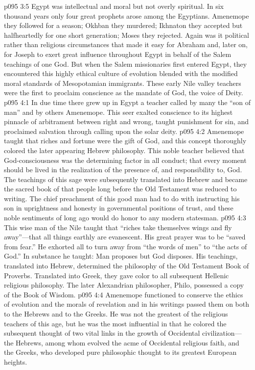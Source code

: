 \pc \vs p095 3:5 Egypt was intellectual and moral but not overly spiritual. In six thousand years only four great prophets arose among the Egyptians. Amenemope they followed for a season; Okhban they murdered; Ikhnaton they accepted but halfheartedly for one short generation; Moses they rejected. Again was it political rather than religious circumstances that made it easy for Abraham and, later on, for Joseph to exert great influence throughout Egypt in behalf of the Salem teachings of one God. But when the Salem missionaries first entered Egypt, they encountered this highly ethical culture of evolution blended with the modified moral standards of Mesopotamian immigrants. These early Nile valley teachers were the first to proclaim conscience as the mandate of God, the voice of Deity.\plusone
{}
\vs p095 4:1 In due time there grew up in Egypt a teacher called by many the “son of man” and by others Amenemope. This seer exalted conscience to its highest pinnacle of arbitrament between right and wrong, taught punishment for sin, and proclaimed salvation through calling upon the solar deity.
\vs p095 4:2 Amenemope taught that riches and fortune were the gift of God, and this concept thoroughly colored the later appearing Hebrew philosophy. This noble teacher believed that God\hyp{}consciousness was the determining factor in all conduct; that every moment should be lived in the realization of the presence of, and responsibility to, God. The teachings of this sage were subsequently translated into Hebrew and became the sacred book of that people long before the Old Testament was reduced to writing. The chief preachment of this good man had to do with instructing his son in uprightness and honesty in governmental positions of trust, and these noble sentiments of long ago would do honor to any modern statesman.
\vs p095 4:3 This wise man of the Nile taught that “riches take themselves wings and fly away”---that all things earthly are evanescent. His great prayer was to be “saved from fear.” He exhorted all to turn away from “the words of men” to “the acts of God.” In substance he taught: Man proposes but God disposes. His teachings, translated into Hebrew, determined the philosophy of the Old Testament Book of Proverbs. Translated into Greek, they gave color to all subsequent Hellenic religious philosophy. The later Alexandrian philosopher, Philo, possessed a copy of the Book of Wisdom.
\vs p095 4:4 Amenemope functioned to conserve the ethics of evolution and the morals of revelation and in his writings passed them on both to the Hebrews and to the Greeks. He was not the greatest of the religious teachers of this age, but he was the most influential in that he colored the subsequent thought of two vital links in the growth of Occidental civilization---the Hebrews, among whom evolved the acme of Occidental religious faith, and the Greeks, who developed pure philosophic thought to its greatest European heights.
